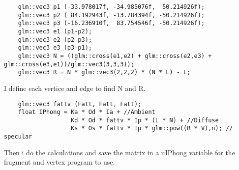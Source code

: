 \documentclass{article}
\begin{document}
\begin{verbatim}
    glm::vec3 p1 (-33.978017f, -34.985076f,  50.214926f);
    glm::vec3 p2 ( 84.192943f, -13.784394f, -50.214926f);
    glm::vec3 p3 (-16.236910f,  83.754546f, -50.214926f);
    glm::vec3 e1 (p1-p2);
    glm::vec3 e2 (p2-p3);
    glm::vec3 e3 (p3-p1);
    glm::vec3 N = ((glm::cross(e1,e2) + glm::cross(e2,e3) + glm::cross(e3,e1))/glm::vec3(3,3,3));
    glm::vec3 R = N * glm::vec3(2,2,2) * (N * L) - L;
\end{verbatim}
I define each vertice and edge to find N and R.

\begin{verbatim}
    glm::vec3 fattv (Fatt, Fatt, Fatt);
    float IPhong = Ka * Od * Ia + //Ambient
                   Kd * Od * fattv * Ip * (L * N) + //Diffuse
                   Ks * Os * fattv * Ip * glm::pow((R * V),n); // specular
\end{verbatim}
Then i do the calculations and save the matrix in a uIPhong variable for the fragment and vertex program to use.
\end{document}
